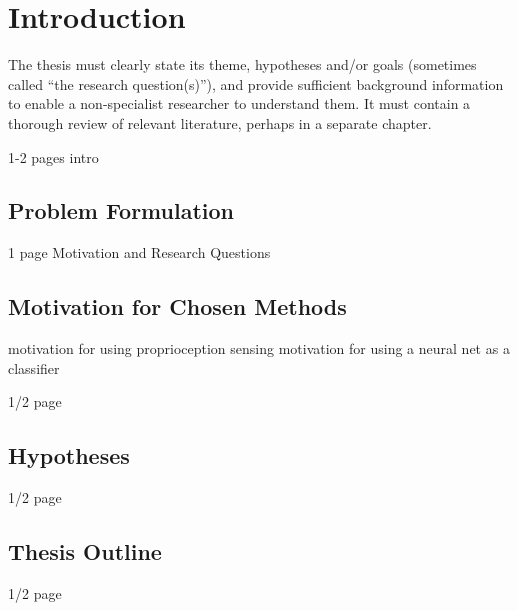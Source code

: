\chapter{Introduction} \label{chapter:01:introduction}

The thesis must clearly state its theme, hypotheses and/or goals (sometimes called “the research question(s)”), and provide sufficient background information to enable a non-specialist researcher to understand them. It must contain a thorough review of relevant literature, perhaps in a separate chapter.

1-2 pages intro

\section{Problem Formulation}
1 page
Motivation and Research Questions

\section{Motivation for Chosen Methods}
motivation for using proprioception sensing
motivation for using a neural net as a classifier

1/2 page

\section{Hypotheses}

1/2 page

\section{Thesis Outline}

1/2 page 